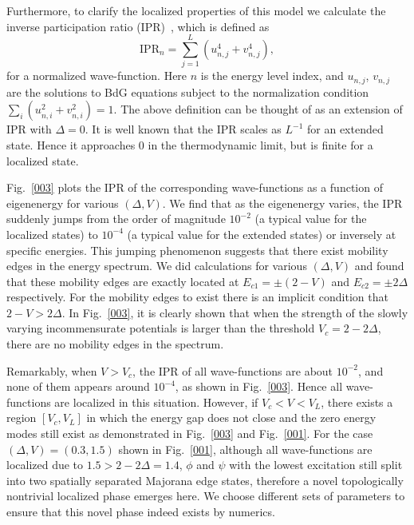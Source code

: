 \documentclass[prb,showpacs,twocolumn,aps,superscriptaddress,a4paper]{revtex4-1}
\begin{document}
Furthermore, to clarify the localized properties of this model we calculate the inverse participation ratio (IPR)~\cite{IPR21,IPR22,IPR23}, which is defined as
\begin{equation}
\text{IPR}_n =\sum_{j=1}^{L} (u_{n,j}^4 + v_{n,j}^4),
\end{equation}
for a normalized wave-function.
Here $n$ is the energy level index, and $u_{n,j}$, $
v_{n,j}$ are the solutions to BdG equations subject to the normalization condition $ \sum_i (u_{n,i}^2 + v_{n,i}^2)=1$.  The above definition can be thought of as an extension of IPR with $\Delta=0$.
It is well known that the IPR scales as $L^{-1}$ for an extended state. Hence it approaches $0$ in the thermodynamic limit, but is finite for a localized state.

Fig.~\ref{003} plots the IPR of the corresponding wave-functions as a function of eigenenergy for various $(\Delta,V)$. We find that as the eigenenergy varies,
the IPR suddenly jumps from the order of magnitude $10^{-2}$ (a typical value for the localized states) to $10^{-4}$ (a typical value for the extended states) or inversely at specific energies.
This jumping phenomenon suggests that there exist mobility edges in the energy spectrum. We did calculations for various $(\Delta,V)$ and found that these mobility edges are exactly located at $E_{c1}=\pm (2- V)$ and $E_{c2}=\pm 2\Delta$ respectively. For the mobility edges to exist there is an implicit condition that $2-V>2\Delta$. %
In Fig.~\ref{003}, it is clearly shown that when the strength of the slowly varying incommensurate potentials is larger than the threshold $V_c = 2 - 2 \Delta$, there are no mobility edges in the spectrum.

Remarkably, when $V>V_c$, the IPR of all wave-functions are about $10^{-2}$, and none of them appears around $10^{-4}$, as shown in Fig.~\ref{003}. Hence all wave-functions are localized in this situation. However, if $V_c<V<V_L$, there exists a region $[V_c,V_L]$ in which the energy gap does not close and the zero energy modes still exist as demonstrated in Fig.~\ref{003} and Fig.~\ref{001}. For the case $(\Delta,V)=(0.3,1.5)$ shown in Fig.~\ref{001}, although all wave-functions are localized due to $1.5>2-2\Delta=1.4$, $\phi$ and $\psi$ with the lowest excitation still split into two spatially separated Majorana edge states, therefore a novel topologically nontrivial localized phase emerges here. We choose different sets of parameters to ensure that this novel phase indeed exists by numerics.
\end{document}
